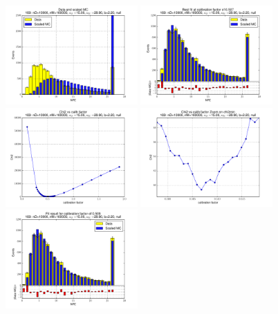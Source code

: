 
 \begin{figure}[htbp] \begin{center} 
\includegraphics[width=0.45\textwidth]{../FIGURES/169/FIG_Data_and_scaled_MC.pdf} 
\includegraphics[width=0.45\textwidth]{../FIGURES/169/FIG_Best_fit_at_calibration_factor_of_0_507.pdf} 
\includegraphics[width=0.45\textwidth]{../FIGURES/169/FIG_Chi2_vs_calib_factor.pdf} 
\includegraphics[width=0.45\textwidth]{../FIGURES/169/FIG_Chi2_vs_calib_factor_Zoom_on_chi2min.pdf} 
\includegraphics[width=0.45\textwidth]{../FIGURES/169/FIG_Fit_result_for_calibration_factor_of_0_509.pdf} 

\end{center}
\end{figure}
